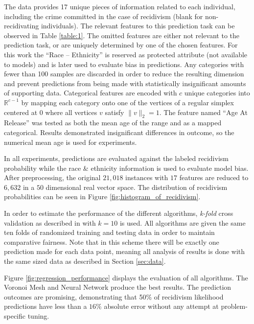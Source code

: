 \documentclass[conference]{IEEEtran}
\begin{document}
The data provides 17 unique pieces of information related to each individual, including the crime committed in the case of recidivism (blank for non-recidivating individuals). The relevant features to this prediction task can be observed in Table \ref{table:1}. The omitted features are either not relevant to the prediction task, or are uniquely determined by one of the chosen features. For this work the ``Race -- Ethnicity'' is reserved as protected attribute (not available to models) and is later used to evaluate bias in predictions. Any categories with fewer than 100 samples are discarded in order to reduce the resulting dimension and prevent predictions from being made with statistically insignificant amounts of supporting data. Categorical features are encoded with $c$ unique categories into $\mathbb{R}^{c-1}$ by mapping each category onto one of the vertices of a regular simplex centered at 0 where all vertices $v$ satisfy $\|v\|_2 = 1$. The feature named ``Age At Release'' was tested as both the mean age of the range and as a mapped categorical. Results demonstrated insignificant differences in outcome, so the numerical mean age is used for experiments.

In all experiments, predictions are evaluated against the labeled recidivism probability while the race \& ethnicity information is used to evaluate model bias. After preprocessing, the original $21,018$ instances with $17$ features are reduced to $6,632$ in a $50$ dimensional real vector space. The distribution of recidivism probabilities can be seen in Figure \ref{fig:histogram_of_recidivism}.

In order to estimate the performance of the different algorithms, \textit{k-fold} cross validation as described in \cite{kohavi1995study} with $k=10$ is used. All algorithms are given the same ten folds of randomized training and testing data in order to maintain comparative fairness. Note that in this scheme there will be exactly one prediction made for each data point, meaning all analysis of results is done with the same sized data as described in Section \ref{sec:data}.

Figure \ref{fig:regression_performance} displays the evaluation of all algorithms. The Voronoi Mesh and Neural Network produce the best results. The prediction outcomes are promising, demonstrating that 50\% of recidivism likelihood predictions have less than a $16\%$ absolute error without any attempt at problem-specific tuning.


\end{document}
